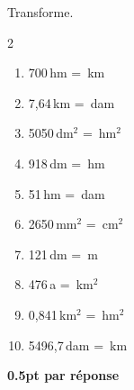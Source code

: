 
\question[5]
Transforme.	

\vspace{10pt}
\setlength{\columnsep}{50pt}
\begin{multicols}{2}
\begin{enumerate}[leftmargin=*,align=parleft, label=\alph*), itemsep=15pt]
\item 700\,hm = \,km
\item 7,64\,km = \,dam
\item 5050\,dm$^2$ = \,hm$^2$
\item 918\,dm = \,hm
\item 51\,hm = \,dam
\item 2650\,mm$^2$ = \,cm$^2$
\item 121\,dm = \,m
\item 476\,a = \,km$^2$
\item 0,841\,km$^2$ = \,hm$^2$
\item 5496,7\,dam = \,km
\end{enumerate}
\end{multicols}
\setlength{\columnsep}{10pt}

\begin{solution}[0pt]
\textbf{0.5pt par réponse}
\end{solution}

